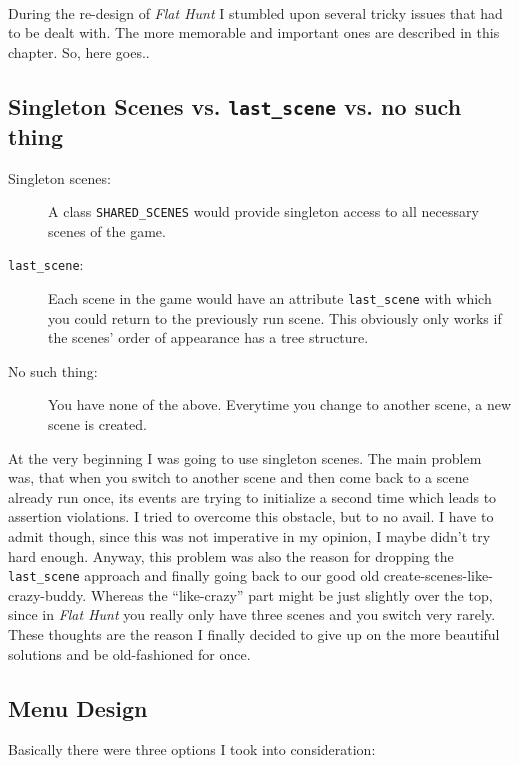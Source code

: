 
\paragraph{}
During the re-design of \emph{Flat Hunt} I stumbled upon several tricky issues that had to be dealt with. The more memorable and important ones are described in this chapter. So, here goes..

\subsection{\label{scenes_decision}Singleton Scenes vs. \texttt{last\_scene} vs. no such thing}
\begin{description}
  \item[Singleton scenes:] A class \texttt{SHARED\_SCENES} would provide singleton access to all necessary scenes of the game.
  \item[\texttt{last\_scene}:] Each scene in the game would have an attribute \texttt{last\_scene} with which you could return to the previously run scene. This obviously only works if the scenes' order of appearance has a tree structure.
  \item[No such thing:] You have none of the above. Everytime you change to another scene, a new scene is created.
\end{description}
At the very beginning I was going to use singleton scenes. The main problem was, that when you switch to another scene and then come back to a scene already run once, its events are trying to initialize a second time which leads to assertion violations. I tried to overcome this obstacle, but to no avail. I have to admit though, since this was not imperative in my opinion, I maybe didn't try hard enough. Anyway, this problem was also the reason for dropping the \texttt{last\_scene} approach and finally going back to our good old create-scenes-like-crazy-buddy. Whereas the ``like-crazy'' part might be just slightly over the top, since in \emph{Flat Hunt} you really only have three scenes and you switch very rarely. These thoughts are the reason I finally decided to give up on the more beautiful solutions and be old-fashioned for once.

\subsection{Menu Design}
Basically there were three options I took into consideration:


